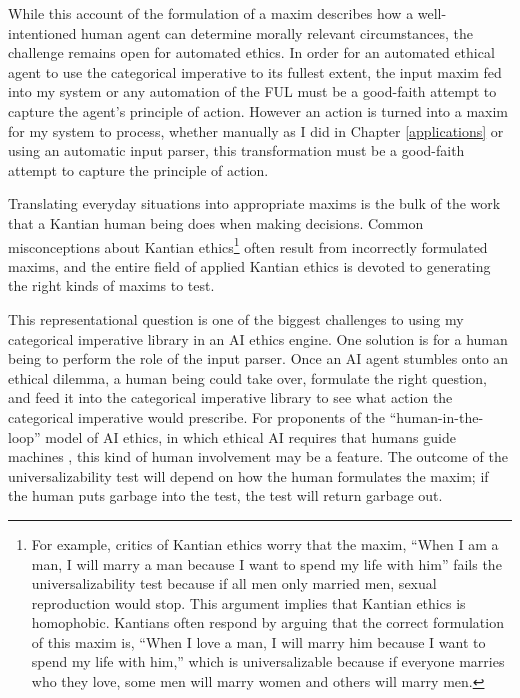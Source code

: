 \begin{isabellebody}
\begin{isamarkuptext}
While this account of the formulation of a maxim describes how a well-intentioned human agent can determine 
morally relevant circumstances, the challenge remains open for automated ethics. In order for an automated
ethical agent to use the categorical imperative to its fullest extent, the input maxim fed into
my system or any automation of the FUL must be a good-faith attempt to capture the agent's principle
of action. However an action is turned into a maxim for my system to process, whether manually as I did
in Chapter \ref{applications} or using an automatic input parser, this transformation must be a good-faith 
attempt to capture the principle of action. 

Translating everyday situations into appropriate maxims is the bulk of the work that a Kantian human 
being does when making decisions. Common misconceptions about Kantian ethics\footnote{For example, critics 
of Kantian ethics worry that the maxim, ``When I am a
man, I will marry a man because I want to spend my life with him'' fails the universalizability
test because if all men only married men, sexual reproduction would stop. This argument implies 
that Kantian ethics is homophobic. Kantians often respond by arguing that the correct formulation of 
this maxim is, ``When I love a man, I will marry him because I want to spend my life with him,'' which
is universalizable because if everyone marries who they love, some men will marry women and others will
marry men.} often result from incorrectly formulated maxims, 
and the entire field of applied Kantian ethics is devoted to generating the right kinds of maxims to test. 

This representational question is one of the biggest challenges to using my categorical imperative library
in an AI ethics engine. One solution is for a human being to perform the role of the input
parser. Once an AI agent stumbles onto an ethical dilemma, a human being could take over, formulate 
the right question, and feed it into the categorical imperative library to see what action the categorical 
imperative would prescribe. For proponents of the ``human-in-the-loop'' model of AI ethics, in which 
ethical AI requires that humans guide machines \cite{loop}, this kind of human involvement may be a feature.
The outcome of the universalizability test will depend on how the human formulates the maxim; if the 
human puts garbage into the test, the test will return garbage out.


\end{isamarkuptext}
\end{isabellebody}
